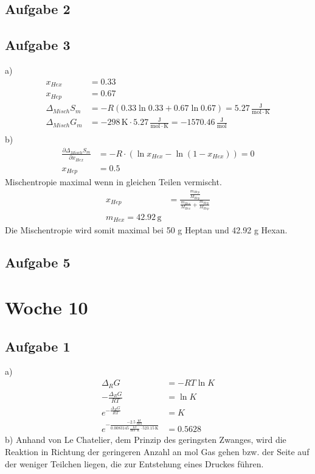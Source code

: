 \documentclass{article}
\begin{document}
\subsection*{Aufgabe 2}

\subsection*{Aufgabe 3}
a)
\begin{align*}
    x_{Hex} &= 0.33\\
    x_{Hep} &= 0.67\\
    \Delta_{Misch}S_m &= -R(0.33\ln 0.33 + 0.67 \ln 0.67) = 5.27\,\mathrm{\frac{J}{mol \cdot K}}\\
    \Delta_{Misch}G_m &= -298\,\mathrm{K}\cdot 5.27\,\mathrm{\frac{J}{mol \cdot K}} = -1570.46\,\mathrm{\frac{J}{mol}}\\ 
\end{align*}
b)
\begin{align*}
    \frac{\partial \Delta_{Misch}S_m}{\partial x_{Hex}} &= -R\cdot (\ln x_{Hex}-\ln (1-x_{Hex})) = 0\\
    x_{Hep} &= 0.5
\end{align*}
Mischentropie maximal wenn in gleichen Teilen vermischt.\\
\begin{align*}
    x_{Hep} &= \frac{\frac{m_{Hep}}{M_{Hep}}}{\frac{m_{Hex}}{M_{Hex}}+\frac{m_{Hep}}{M_{Hep}}}\\
    m_{Hex} = 42.92\,\mathrm{g}
\end{align*}
Die Mischentropie wird somit maximal bei 50 g Heptan und 42.92 g Hexan.

\subsection*{Aufgabe 5}

\section*{Woche 10}
\subsection*{Aufgabe 1}
a)
\begin{align*}
    \Delta_R G &= -RT\ln K\\
    -\frac{\Delta_R G}{RT} &= \ln K\\
    e^{-\frac{\Delta_R G}{RT}} &= K\\
    e^{-\frac{-2.5\,\mathrm{\frac{kJ}{mol}}}{0.0083145\,\mathrm{\frac{kJ}{mol\cdot K}}\cdot 523.15\,\mathrm{K}}} &= 0.5628
\end{align*}
b)
Anhand von Le Chatelier, dem Prinzip des geringsten Zwanges, wird die Reaktion in Richtung der geringeren Anzahl an mol Gas gehen bzw. der Seite auf der weniger Teilchen liegen, die zur Entstehung eines Druckes führen.
\end{document}
